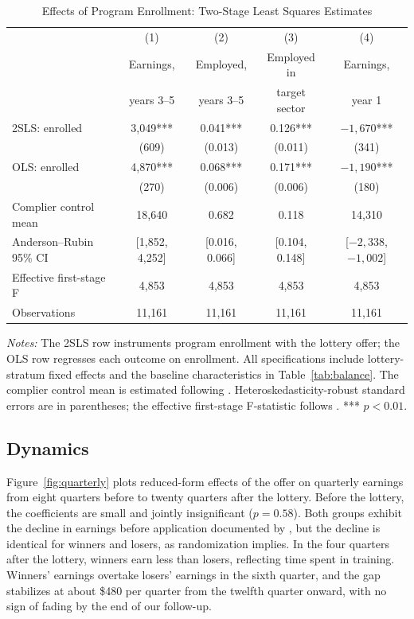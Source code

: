 \documentclass[12pt]{article}
\begin{document}
\begin{table}[htbp]
\centering
\small
\caption{Effects of Program Enrollment: Two-Stage Least Squares Estimates}
\label{tab:iv}
\begin{tabular}{lcccc}
\toprule
 & (1) & (2) & (3) & (4) \\
 & Earnings, & Employed, & Employed in & Earnings, \\
 & years 3--5 & years 3--5 & target sector & year 1 \\
\midrule
2SLS: enrolled & 3,049*** & 0.041*** & 0.126*** & $-1,670$*** \\
 & (609) & (0.013) & (0.011) & (341) \\
OLS: enrolled & 4,870*** & 0.068*** & 0.171*** & $-1,190$*** \\
 & (270) & (0.006) & (0.006) & (180) \\
\midrule
Complier control mean & 18,640 & 0.682 & 0.118 & 14,310 \\
Anderson--Rubin 95\% CI & [1,852, 4,252] & [0.016, 0.066] & [0.104, 0.148] & [$-2,338$, $-1,002$] \\
Effective first-stage F & 4,853 & 4,853 & 4,853 & 4,853 \\
Observations & 11,161 & 11,161 & 11,161 & 11,161 \\
\bottomrule
\end{tabular}
\par\medskip
\begin{minipage}{0.92\linewidth}
\footnotesize \textit{Notes:} The 2SLS row instruments program enrollment with the lottery offer; the OLS row regresses each outcome on enrollment. All specifications include lottery-stratum fixed effects and the baseline characteristics in Table~\ref{tab:balance}. The complier control mean is estimated following \citet{abadie2002}. Heteroskedasticity-robust standard errors are in parentheses; the effective first-stage F-statistic follows \citet{montielolea2013}. *** $p<0.01$.
\end{minipage}
\end{table}

\subsection{Dynamics}

Figure~\ref{fig:quarterly} plots reduced-form effects of the offer on quarterly earnings from eight quarters before to twenty quarters after the lottery. Before the lottery, the coefficients are small and jointly insignificant ($p = 0.58$). Both groups exhibit the decline in earnings before application documented by \citet{ashenfelter1978}, but the decline is identical for winners and losers, as randomization implies. In the four quarters after the lottery, winners earn less than losers, reflecting time spent in training. Winners' earnings overtake losers' earnings in the sixth quarter, and the gap stabilizes at about \$480 per quarter from the twelfth quarter onward, with no sign of fading by the end of our follow-up.
\end{document}
